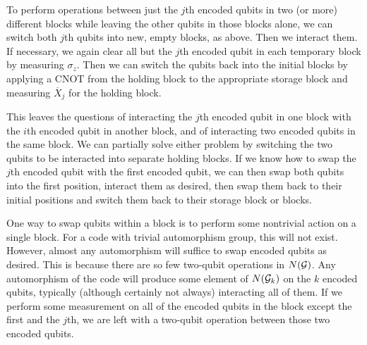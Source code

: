 \documentclass{report}
\newcommand{\G}{{\cal G}}
\newcommand{\Z}{\sigma_z}
\newcommand{\Xbar}{\overline{X}}
\begin{document}
To perform operations between just the $j$th encoded qubits in two (or 
more) different blocks while leaving the other qubits in those blocks alone, 
we can switch both $j$th qubits into new, empty blocks, as above.  Then 
we interact them.  If necessary, we again clear all but the $j$th encoded 
qubit in each temporary block by measuring $\Z$.  Then we can switch the 
qubits back into the initial blocks by applying a CNOT from the holding 
block to the appropriate storage block and measuring $\Xbar_j$ for the 
holding block.

This leaves the questions of interacting the $j$th encoded qubit in one block 
with the $i$th encoded qubit in another block, and of interacting two encoded 
qubits in the same block.  We can partially solve either problem by switching 
the two qubits to be interacted into separate holding blocks.  If we know how 
to swap the $j$th encoded qubit with the first encoded qubit, we can then 
swap both qubits into the first position, interact them as desired, then 
swap them back to their initial positions and switch them back to their 
storage block or blocks.

One way to swap qubits within a block is to perform some nontrivial action 
on a single block.  For a code with trivial automorphism group, this will not 
exist.  However, almost any automorphism will suffice to swap encoded 
qubits as desired.  This is because there are so few two-qubit operations in 
$N(\G)$.  Any automorphism of the code will produce some element of 
$N(\G_k)$ on the $k$ encoded qubits, typically (although certainly not 
always) interacting all of them.  If we perform some measurement on all of 
the encoded qubits in the block except the first and the $j$th, we are left 
with a two-qubit operation between those two encoded qubits.
\end{document}
